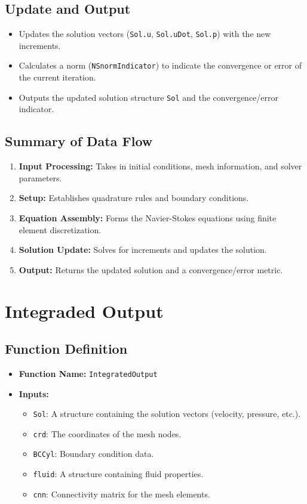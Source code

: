 \documentclass[a4paper,12pt]{article} %
\begin{document}
\subsection*{Update and Output}
\begin{itemize}
    \item Updates the solution vectors (\texttt{Sol.u}, \texttt{Sol.uDot}, \texttt{Sol.p}) with the new increments.
    \item Calculates a norm (\texttt{NSnormIndicator}) to indicate the convergence or error of the current iteration.
    \item Outputs the updated solution structure \texttt{Sol} and the convergence/error indicator.
\end{itemize}

\subsection*{Summary of Data Flow}
\begin{enumerate}
    \item \textbf{Input Processing:} Takes in initial conditions, mesh information, and solver parameters.
    \item \textbf{Setup:} Establishes quadrature rules and boundary conditions.
    \item \textbf{Equation Assembly:} Forms the Navier-Stokes equations using finite element discretization.
    \item \textbf{Solution Update:} Solves for increments and updates the solution.
    \item \textbf{Output:} Returns the updated solution and a convergence/error metric.
\end{enumerate}


\section{Integraded Output}

\subsection*{Function Definition}
\begin{itemize}
    \item \textbf{Function Name:} \texttt{IntegratedOutput}
    \item \textbf{Inputs:}
    \begin{itemize}
        \item \texttt{Sol}: A structure containing the solution vectors (velocity, pressure, etc.).
        \item \texttt{crd}: The coordinates of the mesh nodes.
        \item \texttt{BCCyl}: Boundary condition data.
        \item \texttt{fluid}: A structure containing fluid properties.
        \item \texttt{cnn}: Connectivity matrix for the mesh elements.
    \end{itemize}
\end{itemize}
\end{document}
